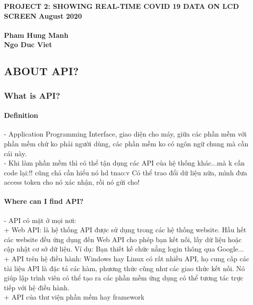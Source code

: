 \documentclass[class]{article}
\date{}
\begin{document}
\section*{}
\begin{center}
\textbf{\LARGE PROJECT 2: SHOWING REAL-TIME COVID 19 DATA ON LCD SCREEN} 
\textbf{\Large August 2020 \\ \\
Pham Hung Manh \\ 
Ngo Duc Viet }


\end{center}
\newpage
\tableofcontents
\newpage
\pagestyle{fancy}
\begin{center}
\part{\LARGE  ABOUT API?}

\end{center}
 
\section{What is API?}

\subsection{Definition}
- Application Programming Interface, giao diện cho máy, giữa các phần mềm với phần mềm chứ ko phải người dùng, các phần mềm ko có ngôn ngữ chung mà cần cái này. \\
- Khi làm phần mềm thì có thể tận dụng các API của hệ thống khác...mà k cần code lại:!! cũng chả cần hiểu nó hd tnao:v Có thể trao đổi dữ liệu nữa, mình đưa access token cho nó xác nhận, rồi nó gửi cho!
\subsection{Where can I find API?}
- API có mặt ở mọi nơi: \\
+ Web API: là hệ thống API được sử dụng trong các hệ thống website. Hầu hết các website đều ứng dụng đến Web API cho phép bạn kết nối, lấy dữ liệu hoặc cập nhật cơ sở dữ liệu. Ví dụ: Bạn thiết kế chức nằng login thông qua Google...\\
+ API trên hệ điều hành: Windows hay Linux có rất nhiều API, họ cung cấp các tài liệu API là đặc tả các hàm, phương thức cũng như các giao thức kết nối. Nó giúp lập trình viên có thể tạo ra các phần mềm ứng dụng có thể tương tác trực tiếp với hệ điều hành. \\
+ API của thư viện phần mềm hay framework \\
\end{document}

